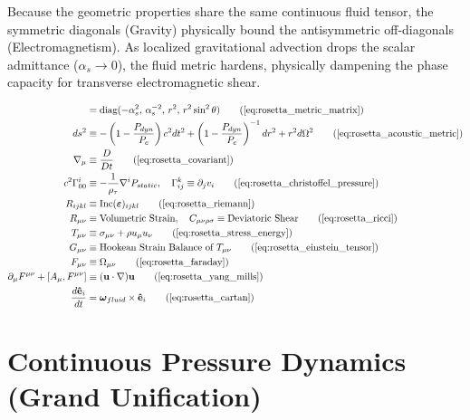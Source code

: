 \documentclass[11pt, a4paper]{article}
\begin{document}
Because the geometric properties share the same continuous fluid tensor, the symmetric diagonals (Gravity) physically bound the antisymmetric off-diagonals (Electromagnetism). As localized gravitational advection drops the scalar admittance ($\alpha_s \to 0$), the fluid metric hardens, physically dampening the phase capacity for transverse electromagnetic shear.


\begin{tcolorbox}[recallbox, title={\ref{box:rosetta_stone}. Tensor Evolution \& Geometric Bending}]
\begin{align}
    [\boldsymbol{g}_{\mu\nu}] &= \text{diag}(-\alpha_s^2, \, \alpha_s^{-2}, \, r^2, \, r^2\sin^2\theta) \tag{\ref{eq:rosetta_metric_matrix}} \\
    ds^2 &\equiv -\left( 1 - \frac{P_{dyn}}{P_c} \right) c^2 dt^2 + \left( 1 - \frac{P_{dyn}}{P_c} \right)^{-1} dr^2 + r^2 d\Omega^2 \tag{\ref{eq:rosetta_acoustic_metric}} \\
    \nabla_\mu &\equiv \frac{D}{Dt} \tag{\ref{eq:rosetta_covariant}} \\
    c^2 \Gamma^i_{00} &\equiv -\frac{1}{\rho_{\tau}} \nabla^i P_{static}, \quad \Gamma^k_{ij} \equiv \partial_j v_i \tag{\ref{eq:rosetta_christoffel_pressure}} \\
    R_{ijkl} &\equiv \text{Inc}(\boldsymbol{\varepsilon})_{ijkl} \tag{\ref{eq:rosetta_riemann}} \\
    R_{\mu\nu} &\equiv \text{Volumetric Strain}, \quad C_{\mu\nu\rho\sigma} \equiv \text{Deviatoric Shear} \tag{\ref{eq:rosetta_ricci}} \\
    T_{\mu\nu} &\equiv \sigma_{\mu\nu} + \rho u_\mu u_\nu \tag{\ref{eq:rosetta_stress_energy}} \\
    G_{\mu\nu} &\equiv \text{Hookean Strain Balance of } T_{\mu\nu} \tag{\ref{eq:rosetta_einstein_tensor}} \\
    F_{\mu\nu} &\equiv \Omega_{\mu\nu} \tag{\ref{eq:rosetta_faraday}} \\
    \partial_\mu F^{\mu\nu} + [A_\mu, F^{\mu\nu}] &\equiv (\mathbf{u} \cdot \nabla)\mathbf{u} \tag{\ref{eq:rosetta_yang_mills}} \\
    \frac{d\mathbf{\hat{e}}_i}{dt} &= \boldsymbol{\omega}_{fluid} \times \mathbf{\hat{e}}_i \tag{\ref{eq:rosetta_cartan}}
\end{align}
\end{tcolorbox}


\section{Continuous Pressure Dynamics (Grand Unification)}
\label{sec:deriv_pressure_gradient}
\end{document}
